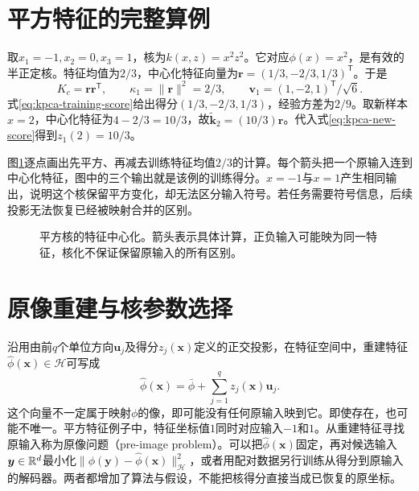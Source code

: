 \section{平方特征的完整算例}
取$x_1=-1,x_2=0,x_3=1$，核为$k(x,z)=x^2z^2$。它对应$\phi(x)=x^2$，是有效的半正定核。特征均值为$2/3$，中心化特征向量为$\bm r=(1/3,-2/3,1/3)^{\mathsf T}$。于是
\begin{equation}
 K_c=\bm r\bm r^{\mathsf T},\qquad
 \kappa_1=\|\bm r\|^2=2/3,\qquad
 \bm v_1=(1,-2,1)^{\mathsf T}/\sqrt6.
\end{equation}
式\eqref{eq:kpca-training-score}给出得分$(1/3,-2/3,1/3)$，经验方差为$2/9$。取新样本$x=2$，中心化特征为$4-2/3=10/3$，故$\tilde{\bm k}_{2}=(10/3)\bm r$。代入式\eqref{eq:kpca-new-score}得到$z_1(2)=10/3$。

图\ref{fig:kpca-square-map}逐点画出先平方、再减去训练特征均值$2/3$的计算。每个箭头把一个原输入连到中心化特征，图中的三个输出就是该例的训练得分。$x=-1$与$x=1$产生相同输出，说明这个核保留平方变化，却无法区分输入符号。若任务需要符号信息，后续投影无法恢复已经被映射合并的区别。
\begin{figure}[htbp]
\centering
{}
\caption{平方核的特征中心化。箭头表示具体计算，正负输入可能映为同一特征，核化不保证保留原输入的所有区别。}
\label{fig:kpca-square-map}
\end{figure}

\section{原像重建与核参数选择}
沿用由前$q$个单位方向$\bm u_j$及得分$z_j(\bm x)$定义的正交投影，在特征空间中，重建特征$\hat\phi(\bm x)\in\mathcal H$可写成
\begin{equation}
 \hat\phi(\bm x)=\bar\phi+\sum_{j=1}^qz_j(\bm x)\bm u_j.
\end{equation}
这个向量不一定属于映射$\phi$的像，即可能没有任何原输入映到它。即使存在，也可能不唯一。平方特征例子中，特征坐标值$1$同时对应输入$-1$和$1$。从重建特征寻找原输入称为原像问题（pre-image problem）。可以把$\hat\phi(\bm x)$固定，再对候选输入$\bm y\in\mathbb{R}^d$最小化$\|\phi(\bm y)-\hat\phi(\bm x)\|_{\mathcal H}^2$，或者用配对数据另行训练从得分到原输入的解码器。两者都增加了算法与假设，不能把核得分直接当成已恢复的原坐标。

